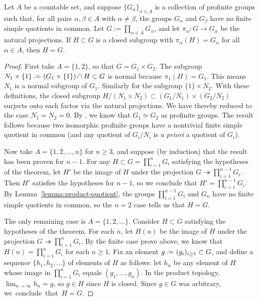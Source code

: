 	\begin{theorem} \label{theorem:goursat}
		Let $A$ be a countable set, and suppose $\{G_\alpha\}_{\alpha \in A}$ is a collection of profinite groups such that, for all pairs $\alpha, \beta \in A$ with $\alpha \neq \beta$, the groups $G_\alpha$ and $G_\beta$ have no finite simple quotients in common. Let $G := \prod_{\alpha \in A} G_\alpha$, and let $\pi_\alpha : G \to G_\alpha$ be the natural projections. If $H \subset G$ is a closed subgroup with $\pi_\alpha(H) = G_\alpha$ for all $\alpha \in A$, then $H = G$.
	\end{theorem}
	\begin{proof}
		First take $A = \{1, 2\}$, so that $G = G_1 \times G_2$. The subgroup
		\(
			N_1 \times \{1\} \defeq (G_1 \times \{1\}) \cap H \subset G
		\)
		is normal because $\pi_1(H) = G_1$. This means $N_1$ is a normal subgroup of $G_1$. Similarly for the subgroup $\{1\} \times N_2$. With these definitions, the closed subgroup
		\(
			H / (N_1 \times N_2) \subset (G_1 / N_1) \times (G_2 / N_2)
		\)
		surjects onto each factor via the natural projections. We have thereby reduced to the case $N_1 = N_2 = 0$. By \cite[Lemma 5.2.1]{ribbit}, we know that $G_1 \simeq G_2$ as profinite groups. The result follows because two isomorphic profinite groups have a nontrivial finite simple quotient in common (and any quotient of $G_i / N_i$ is \emph{a priori} a quotient of $G_i$).
		
		Now take $A = \{1, 2, \ldots, n\}$ for $n \ge 3$, and suppose (by induction) that the result has been proven for $n-1$. For any $H \subset G = \prod_{i=1}^n G_i$ satisfying the hypotheses of the theorem, let $H'$ be the image of $H$ under the projection $G \twoheadrightarrow \prod_{i=1}^{n-1} G_i$. Then $H'$ satisfies the hypotheses for $n-1$, so we conclude that $H' = \prod_{i=1}^{n-1} G_i$. By Lemma~\ref{lemma:product-quotient}, the groups $\prod_{i=1}^{n-1} G_i$ and $G_n$ have no finite simple quotients in common, so the $n = 2$ case tells us that $H = G$.
		
		The only remaining case is $A = \{1, 2, \ldots\}$. Consider $H \subset G$ satisfying the hypotheses of the theorem. For each $n$, let $H(n)$ be the image of $H$ under the projection $G \twoheadrightarrow \prod_{i=1}^{n} G_i$. By the finite case prove above, we know that $H(n) = \prod_{i=1}^n G_i$ for each $n \ge 1$. Fix an element $g \defeq (g_i)_{i \ge 1} \subset G$, and define a sequence $\{h_1, h_2, \ldots\}$ of elements of $H$ as follows: let $h_n$ be any element of $H$ whose image in $\prod_{i=1}^n G_i$ equals $(g_1, \ldots, g_n)$. In the product topology, $\lim_{n \rightarrow \infty} h_n = g$, so $g \in H$ since $H$ is closed. Since $g \in G$ was arbitrary, \mbox{we conclude that $H = G$.}
	\end{proof}

